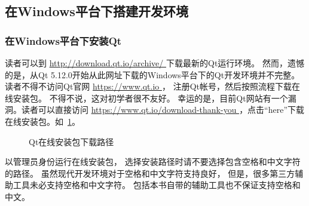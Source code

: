 ﻿




%

\FloatBarrier
\subsection{
在Windows平台下搭建开发环境
}\label{s000110}


\FloatBarrier
\subsubsection{
在Windows平台下安装Qt
}\label{ss000110}


读者可以到 \url{http://download.qt.io/archive/
}
下载最新的Qt运行环境。
然而，遗憾的是，从Qt 5.12.0开始从此网址下载的Windows平台下的Qt开发环境并不完整。
读者不得不访问Qt官网 \url{https://www.qt.io
}，
注册Qt帐号，然后按照流程下载在线安装包。
不得不说，这对初学者很不友好。
幸运的是，目前Qt网站有一个漏洞。读者可以直接访问
 \url{https://www.qt.io/download-thank-you
}，点击“here”下载在线安装包。如\figurename\ \ref{p000000}。
\begin{figure}[htb] %
\marginnote{\setlength\fboxsep{2pt}\fbox{\footnotesize{\kaishu\figurename\,}\footnotesize{\ref{p000000}}}}\centering %
\setlength\fboxsep{0pt} %
\caption{Qt在线安装包下载路径} %
\label{p000000} %
\end{figure}

以管理员身份运行在线安装包，
选择安装路径时请不要选择包含空格和中文字符的路径。
虽然现代开发环境对于空格和中文字符支持良好，
但是，很多第三方辅助工具未必支持空格和中文字符。
包括本书自带的辅助工具也不保证支持空格和中文。


